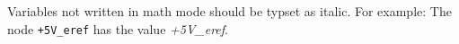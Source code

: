

Variables not written in math mode should be typset as italic.  For
example: The node \texttt{+5V\_eref} has the value \textit{+5V\_eref}.
